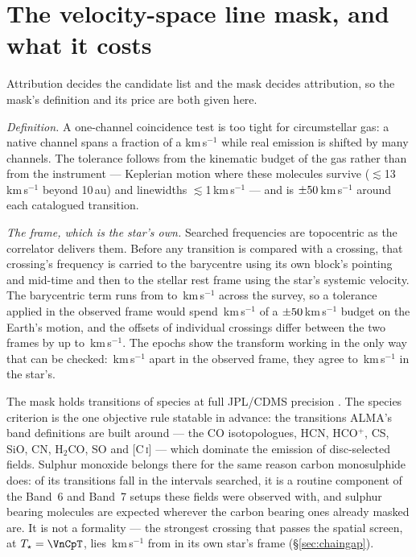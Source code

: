 \section{The velocity-space line mask, and what it costs}
\label{app:linemask}

Attribution decides the candidate list and the mask decides attribution, so
the mask's definition and its price are both given here.

\emph{Definition.} A one-channel coincidence test is too tight for
circumstellar gas: a native channel spans a fraction of a km\,s$^{-1}$ while
real emission is shifted by many channels. The tolerance follows from the
kinematic budget of the gas rather than from the instrument --- Keplerian
motion where these molecules survive ($\lesssim$13\,km\,s$^{-1}$ beyond
10\,au) and linewidths $\lesssim$1\,km\,s$^{-1}$ --- and is
$\pm50$\,km\,s$^{-1}$ around each catalogued transition.

\emph{The frame, which is the star's own.} Searched frequencies are
topocentric as the correlator delivers them. Before any transition is
compared with a crossing, that crossing's frequency is carried to the
barycentre using its own block's pointing and mid-time and then to the
stellar rest frame using the star's systemic velocity. The barycentric term
runs from \FrBaryLo{} to \FrBaryHi\,km\,s$^{-1}$ across the survey, so a
tolerance applied in the observed frame would spend
\FrBarySwing\,km\,s$^{-1}$ of a $\pm50$\,km\,s$^{-1}$ budget on
the Earth's motion, and the offsets of individual crossings differ between
the two frames by up to \MaskFrameShiftKms\,km\,s$^{-1}$. The
\FrEpochNEpoch{} \FrEpochStar{} epochs show the transform working in the
only way that can be checked: \FrEpochTopoKms\,km\,s$^{-1}$ apart in the
observed frame, they agree to \FrEpochStelKms\,km\,s$^{-1}$ in the star's.

The mask holds \FrNTrans{} transitions of \FrNSpec{} species at full
JPL/CDMS precision \citep{Pickett1998,CDMS2005}. The species criterion is
the one objective rule statable in advance: the transitions ALMA's band
definitions are built around --- the CO isotopologues, HCN, HCO$^{+}$, CS,
SiO, CN, H$_2$CO, SO and [C\,\textsc{i}] --- which dominate the emission of
disc-selected fields. Sulphur monoxide belongs there for the same reason
carbon monosulphide does: \FrNSOWord{} of its transitions fall in the
intervals searched, it is a routine component of the Band~6 and Band~7
setups these fields were observed with, and sulphur bearing molecules are
expected wherever the carbon bearing ones already masked are. It is not a
formality --- the strongest crossing that passes the spatial screen,
\FrCpStar{} at $T_\star=\VnCpT$, lies \FrCpSODv\,km\,s$^{-1}$ from
\FrSOName{} in its own star's frame (\S\ref{sec:chaingap}).

